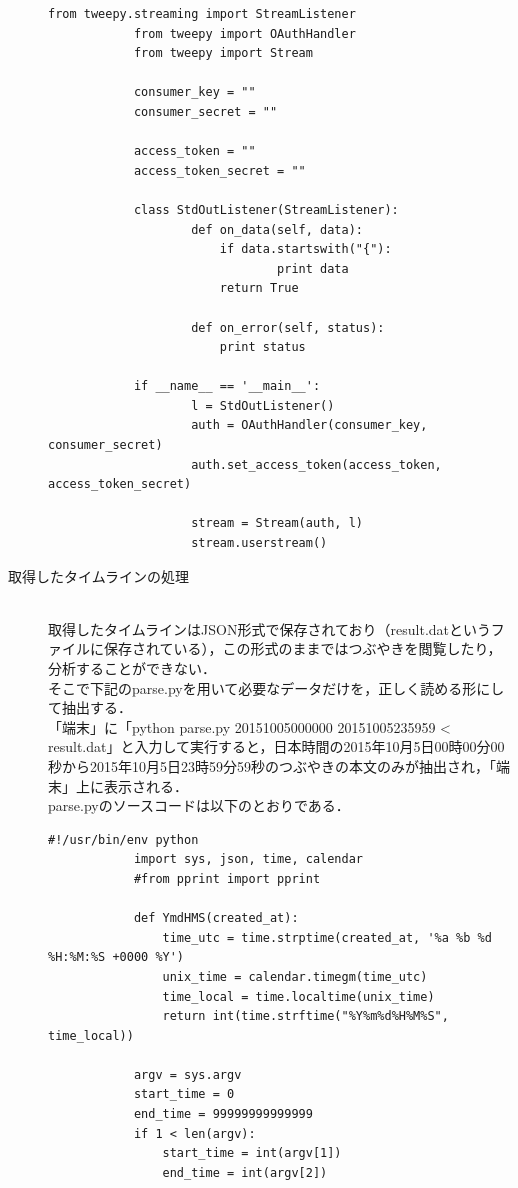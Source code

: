 \begin{description}
\begin{lstlisting}[caption={}, label={}]
			from tweepy.streaming import StreamListener
			from tweepy import OAuthHandler
			from tweepy import Stream
 
			consumer_key = ""
			consumer_secret = ""
 
			access_token = ""
			access_token_secret = ""
 
			class StdOutListener(StreamListener):
    				def on_data(self, data):
        				if data.startswith("{"):
            					print data
        				return True
 
    				def on_error(self, status):
        				print status
 
			if __name__ == '__main__':
    				l = StdOutListener()
    				auth = OAuthHandler(consumer_key, consumer_secret)
    				auth.set_access_token(access_token, access_token_secret)
 
    				stream = Stream(auth, l)
    				stream.userstream()
		\end{lstlisting}



 \item[取得したタイムラインの処理]\mbox{}\\
	取得したタイムラインはJSON形式で保存されており（result.datというファイルに保存されている），この形式のままではつぶやきを閲覧したり，分析することができない．\\
	そこで下記のparse.pyを用いて必要なデータだけを，正しく読める形にして抽出する．\\
	「端末」に「python parse.py 20151005000000 20151005235959 < result.dat」と入力して実行すると，日本時間の2015年10月5日00時00分00秒から2015年10月5日23時59分59秒のつぶやきの本文のみが抽出され，「端末」上に表示される．\\
	parse.pyのソースコードは以下のとおりである．
		\begin{lstlisting}[caption={}, label={}]
			#!/usr/bin/env python
			import sys, json, time, calendar
			#from pprint import pprint
 
			def YmdHMS(created_at):
				time_utc = time.strptime(created_at, '%a %b %d %H:%M:%S +0000 %Y')
				unix_time = calendar.timegm(time_utc)
				time_local = time.localtime(unix_time)
				return int(time.strftime("%Y%m%d%H%M%S", time_local))
 
			argv = sys.argv
			start_time = 0
			end_time = 99999999999999
			if 1 < len(argv):
				start_time = int(argv[1])
				end_time = int(argv[2])
 

\end{lstlisting}
\end{description}
